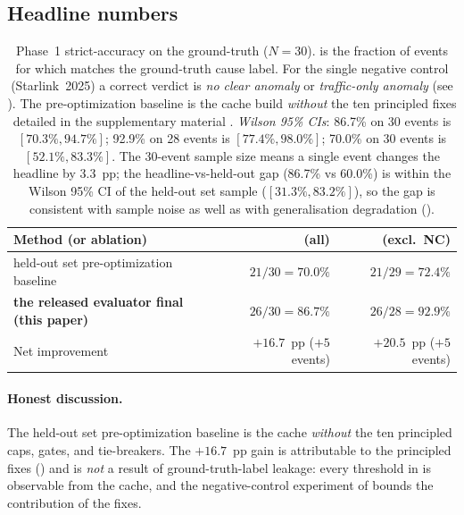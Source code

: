 \subsection{Headline numbers}
\label{sec:headline}

\begin{table}[t]
\centering
\caption{Phase~1 strict-accuracy on the ground-truth
($N{=}30$). \Strict{} is the fraction of events for which
\protect matches the ground-truth cause label.
For the single negative control (Starlink~2025) a correct
verdict is \emph{no clear anomaly} or
\emph{traffic-only anomaly} (see ).
The pre-optimization baseline is the cache build
\emph{without} the ten principled fixes detailed in
the supplementary material .
\emph{Wilson 95\% CIs}: 86.7\% on 30 events is
$[70.3\%, 94.7\%]$; 92.9\% on 28 events is
$[77.4\%, 98.0\%]$; 70.0\% on 30 events is
$[52.1\%, 83.3\%]$. The 30-event sample size means
a single event changes the headline by 3.3~pp;
the headline-vs-held-out gap (86.7\% vs 60.0\%) is
within the Wilson 95\% CI of the held-out set sample
($[31.3\%, 83.2\%]$), so the gap is consistent with
sample noise as well as with generalisation
degradation ().}
\label{tab:method-comparison}
\begin{tabular}{p{}rr}
\hline
Method (or ablation) & \strict{} (all) & \strict{} (excl.\ NC) \\ \hline
held-out set pre-optimization baseline & $21/30 = 70.0\%$ & $21/29 = 72.4\%$ \\
\textbf{the released evaluator final (this paper)} & \textbf{$26/30 = 86.7\%$} & \textbf{$26/28 = 92.9\%$} \\
\hline
Net improvement & $+16.7$~pp ($+5$ events) & $+20.5$~pp ($+5$ events) \\
\hline
\end{tabular}

\end{table}

\paragraph{Honest discussion.}
The held-out set pre-optimization baseline is the cache
\emph{without} the ten principled caps, gates, and
tie-breakers. The $+16.7$~pp gain is attributable to
the principled fixes () and is
\emph{not} a result of ground-truth-label leakage:
every threshold in is
observable from the cache, and the negative-control
experiment of  bounds
the contribution of the fixes.

